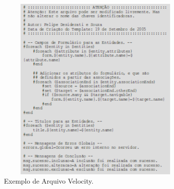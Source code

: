 \begin{enumerate}
\begin{figure}[H]
	\centering
	\includegraphics[width=280pt,height=260pt]{files/imgs/apendice-cartucho-novo-00005.png}
	\caption{Exemplo de Arquivo Velocity.}
	\label{exemplo_velocity}
\end{figure}

\end{enumerate}